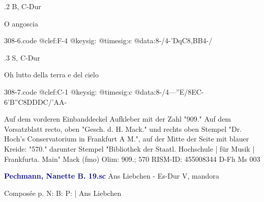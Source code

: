 \documentclass[twocolumn]{book}
\begin{document}
\newline
%
.2  B, C-Dur
\newline \begin{footnotesize} O angoscia \end{footnotesize}  
\begin{filecontents*}{308-6.code}
@clef:F-4
@keysig:
@timesig:c
@data:8-/4-'DqC8,BB4-/
\end{filecontents*}
\newline
%
.3  S, C-Dur
\newline \begin{footnotesize} Oh lutto della terra e del cielo \end{footnotesize}  
\begin{filecontents*}{308-7.code}
@clef:C-1
@keysig:
@timesig:c
@data:8-/4---''E/8EC-6'B''C8DDDC/'AA-
\end{filecontents*}
\newline
%
\newline Auf dem vorderen Einbanddeckel Aufkleber mit der Zahl "909."
\newline Auf dem Vorsatzblatt recto, oben "Gesch. d. H. Mack." und rechts oben Stempel "Dr. Hoch's Conservatorium in Frankfurt A M.", auf der Mitte der Seite mit blauer Kreide: "570." darunter Stempel "Bibliothek der Staatl. Hochschule | für Musik | Frankfurta. Main"
\newline Mack  (fmo)
\newline Olim: 909.; 570
\newline RISM-ID: 455008344
\newline D-Fh  Ms 003
\newline \par \vspace{7pt} \textcolor{darkblue}{\textbf{Pechmann, Nanette B.  19.sc}}
\newline Ans Liebchen - Es-Dur
\newline V, mandora
\newline \begin{itshape}[heading, f.40v:] Composée p. N: B: P: | Ans Liebchen\end{itshape} 
\end{document}
